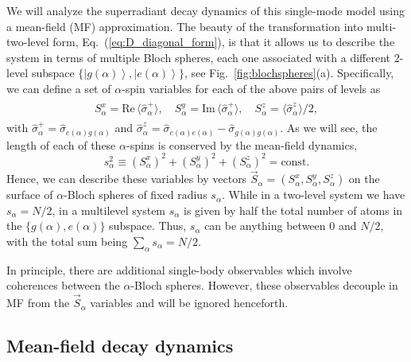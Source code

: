 \documentclass[aps,prx,superscriptaddress,twocolumn,notitlepage,nofootinbib,longbibliography]{revtex4-2}
\newcommand{\ket}[1]{\left|#1\right>}
\renewcommand{\Re}{\mathrm{Re}\,}
\renewcommand{\Im}{\mathrm{Im}\,}
\begin{document}
We will analyze the superradiant decay dynamics of this single-mode model using a mean-field (MF) approximation.
The beauty of the transformation into multi-two-level form, Eq.~(\ref{eq:D_diagonal_form}), is that it allows us to describe the system in terms of multiple Bloch spheres, each one associated with a different 2-level subspace $\{\ket{g(\alpha)},\ket{e(\alpha)}\}$, see Fig.~\ref{fig:blochspheres}(a).
Specifically, we can define a set of $\alpha$-spin variables for each of the above pairs of levels as
\begin{align}
\begin{aligned}
	S^x_\alpha = \Re \langle \hat{\sigma}^+_\alpha \rangle,\quad
	S^y_\alpha = \Im \langle \hat{\sigma}^+_\alpha \rangle,\quad
	S^z_\alpha = \langle \hat{\sigma}^z_\alpha \rangle/2,
\end{aligned}
\label{eq:Salpha_def}
\end{align}
with $\hat{\sigma}^+_\alpha = \hat{\sigma}_{e(\alpha)g(\alpha)} $ and $\hat{\sigma}^z_\alpha = \hat{\sigma}_{e(\alpha)e(\alpha)} -  \hat{\sigma}_{g(\alpha)g(\alpha)}$. 
As we will see, the length of each of these $\alpha$-spins is conserved by the mean-field dynamics,
\begin{equation}
	s_\alpha^2 \equiv (S^x_\alpha)^2+(S^y_\alpha)^2+(S^z_\alpha)^2=\text{const}.
\label{eq:salpha_conserved}
\end{equation}
Hence, we can describe these variables by vectors $\vec{S}_\alpha = ( S^x_\alpha, S^y_\alpha, S^z_\alpha )$ on the surface of $\alpha$-Bloch spheres of fixed radius $s_\alpha$.
While in a two-level system we have $s_\alpha=N/2$, in a multilevel system $s_\alpha$ is given by half the total number of atoms in the $\{g(\alpha),e(\alpha)\}$ subspace. Thus, $s_\alpha$ can be anything between 0 and $N/2$, with the total sum being $\sum_\alpha s_\alpha = N/2$.

In principle, there are additional single-body observables which involve coherences between the $\alpha$-Bloch spheres. However, these observables decouple in MF from the $\vec{S}_\alpha$ variables and will be ignored henceforth.





\subsection{Mean-field decay dynamics\label{ssec:decay_rabi_theta}}
\end{document}
